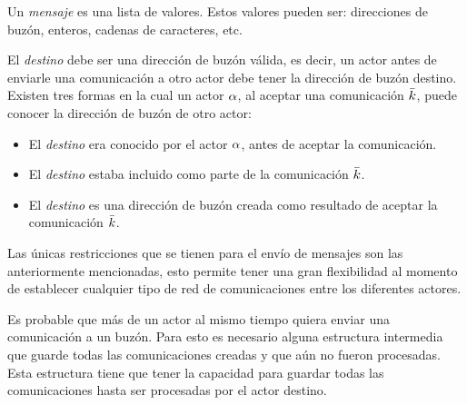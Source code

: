 Un \textit{mensaje} es una lista de valores. Estos valores pueden ser: direcciones de buzón, enteros, cadenas de caracteres, etc. 

El \textit{destino} debe ser una dirección de buzón válida, es decir, un actor antes de enviarle una comunicación a otro actor debe tener la dirección de buzón destino. Existen tres formas en la cual un actor $\alpha$, al aceptar una comunicación $\bar{k}$, puede conocer la dirección de buzón de otro actor:

\begin{itemize}
 \item El \textit{destino} era conocido por el actor $\alpha$, antes de aceptar la comunicación.
 \item El \textit{destino} estaba incluido como parte de la comunicación $\bar{k}$.
 \item El \textit{destino} es una dirección de buzón creada como resultado de aceptar la comunicación $\bar{k}$.
\end{itemize}

Las únicas restricciones que se tienen para el envío de mensajes son las anteriormente mencionadas, esto permite tener una gran flexibilidad al momento de establecer cualquier tipo de red de comunicaciones entre los diferentes actores.

Es probable que más de un actor al mismo tiempo quiera enviar una comunicación a un buzón. Para esto es necesario alguna estructura intermedia que guarde todas las comunicaciones creadas y que aún no fueron procesadas. Esta estructura tiene que tener la capacidad para guardar todas las comunicaciones hasta ser procesadas por el actor destino. 




